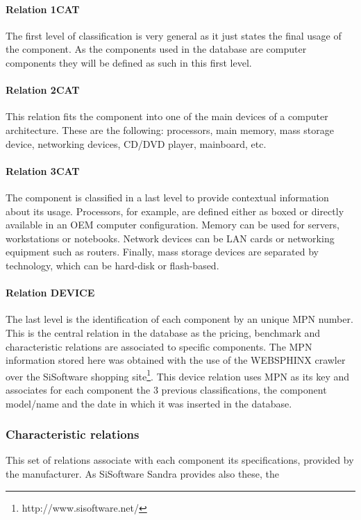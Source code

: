         \paragraph*{Relation 1CAT}
            The first level of classification is very general as it just states the final usage of the component. As the components used in the database are computer components they will be defined as such in this first level.

        \paragraph*{Relation 2CAT}
            This relation fits the component into one of the main devices of a computer architecture. These are the following: processors, main memory, mass storage device, networking devices, CD/DVD player, mainboard, etc.

        \paragraph*{Relation 3CAT}
            The component is classified in a last level to provide contextual information about its usage. Processors, for example, are defined either as boxed or directly available in an OEM computer configuration. Memory can be used for servers, workstations or notebooks. Network devices can be LAN cards or networking equipment such as routers. Finally, mass storage devices are separated by technology, which can be hard-disk or flash-based.

        \paragraph*{Relation DEVICE}
            The last level is the identification of each component by an unique MPN number. This is the central relation in the database as the pricing, benchmark and characteristic relations are associated to specific components. The MPN information stored here was obtained with the use of the WEBSPHINX crawler over the SiSoftware shopping site\footnote{http://www.sisoftware.net/}. This device relation uses MPN as its key and associates for each component the 3 previous classifications, the component model/name and the date in which it was inserted in the database.
            
    \subsubsection*{Characteristic relations}
        This set of relations associate with each component its specifications, provided by the manufacturer. As SiSoftware Sandra provides also these, the 

